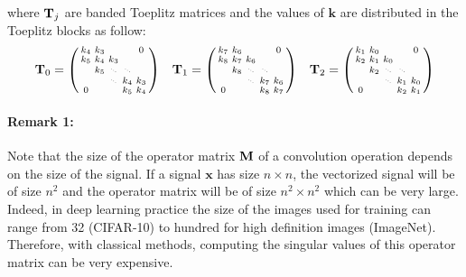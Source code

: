 where $\mathbf{T}_j$ are banded Toeplitz matrices and the values of $\mathbf{k}$ are distributed in the Toeplitz blocks as follow:
\begin{align}
\Tmat_0 = \begin{psmallmatrix}
    k_{4} & k_{3} &  &  &  0 \\
    k_{5} & k_{4} & k_{3} &  &   \\
     & k_{5} & \scalebox{.40}{$\ddots$} & \scalebox{.40}{$\ddots$}  \\
     &  &  \scalebox{.40}{$\ddots$} & k_{4} & k_{3}  \\
    0 &  &  & k_{5} & k_{4}  \\
    \end{psmallmatrix} &&
\Tmat_{1} = \begin{psmallmatrix}
    k_{7} & k_{6} &  &  &  0 \\
    k_{8} & k_{7} & k_{6} &  &   \\
     & k_{8} & \scalebox{.40}{$\ddots$} & \scalebox{.40}{$\ddots$} &    \\
     &  &  \scalebox{.40}{$\ddots$} & k_{7} & k_{6}  \\
    0 &  &  & k_{8} & k_{7}  \\
    \end{psmallmatrix} &&
\Tmat_{2} = \begin{psmallmatrix}
    k_{1} & k_{0} &  &  &  0 \\
    k_{2} & k_{1} & k_{0} &  &   \\
     & k_{2} & \scalebox{.40}{$\ddots$} & \scalebox{.40}{$\ddots$} &    \\
     &  &  \scalebox{.40}{$\ddots$} & k_{1} & k_{0}  \\
    0 &  &  & k_{2} & k_{1}  \\
    \end{psmallmatrix} 
\end{align}


\paragraph{Remark 1: } Note that the size of the operator matrix $\mathbf{M}$ of a convolution operation depends on the size of the signal. If a signal $\mathbf{x}$ has size $n \times n$, the vectorized signal will be of size $n^2$ and the operator matrix will be of size $n^2 \times n^2$ which can be very large. Indeed, in deep learning practice the size of the images used for training can range from 32 (CIFAR-10) to hundred for high definition images (ImageNet). Therefore, with classical methods, computing the singular values of this operator matrix can be very expensive.


